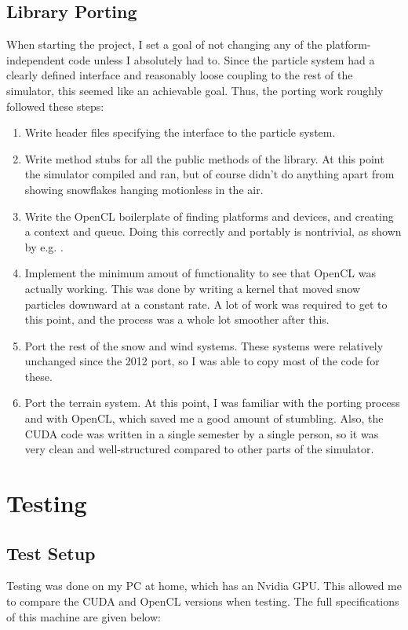 \subsection{Library Porting}
When starting the project, I set a goal of not changing any of the platform-independent code unless I absolutely had to. Since the particle system had a clearly defined interface and reasonably loose coupling to the rest of the simulator, this seemed like an achievable goal. Thus, the porting work roughly followed these steps:
\begin{enumerate}
\item Write header files specifying the interface to the particle system.
\item Write method stubs for all the public methods of the library. At this point the simulator compiled and ran, but of course didn’t do anything apart from showing snowflakes hanging motionless in the air.
\item Write the OpenCL boilerplate of finding platforms and devices, and creating a context and queue. Doing this correctly and portably is nontrivial, as shown by e.g. \citet{fastkor2012boilerplate}.
\item Implement the minimum amout of functionality to see that OpenCL was actually working. This was done by writing a kernel that moved snow particles downward at a constant rate. A lot of work was required to get to this point, and the process was a whole lot smoother after this. 
\item Port the rest of the snow and wind systems. These systems were relatively unchanged since the 2012 port, so I was able to copy most of the code for these.
\item Port the terrain system. At this point, I was familiar with the porting process and with OpenCL, which saved me a good amount of stumbling. Also, the CUDA code was written in a single semester by a single person, so it was very clean and well-structured compared to other parts of the simulator.
\end{enumerate}

\section{Testing}
\subsection{Test Setup}
Testing was done on my PC at home, which has an Nvidia GPU. This allowed me to compare the CUDA and OpenCL versions when testing. The full specifications of this machine are given below:

